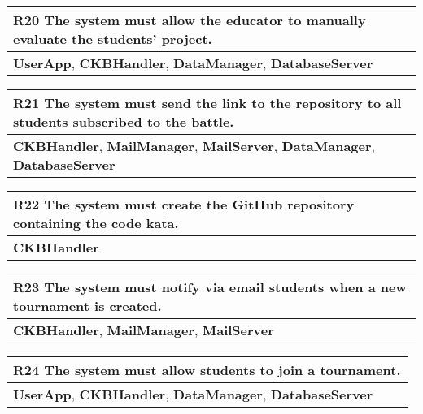 \begin{table}[H]
    \begin{tabularx}{\textwidth}{X}
        \toprule
        \textbf{R20} The system must allow the educator to manually evaluate the students' project. \\ \midrule
        \textbf{UserApp}, \textbf{CKBHandler}, \textbf{DataManager}, \textbf{DatabaseServer} \\
        \end{tabularx}
\end{table}

\begin{table}[H]
    \begin{tabularx}{\textwidth}{X}
        \toprule
        \textbf{R21} The system must send the link to the repository to all students subscribed to the battle.\\ \midrule
        \textbf{CKBHandler}, \textbf{MailManager}, \textbf{MailServer}, \textbf{DataManager}, \textbf{DatabaseServer} \\
    \end{tabularx}
\end{table}

\begin{table}[H]
    \begin{tabularx}{\textwidth}{X}
        \toprule
        \textbf{R22} The system must create the GitHub repository containing the code kata. \\ \midrule
        \textbf{CKBHandler}                   \\
    \end{tabularx}
\end{table}

\begin{table}[H]
    \begin{tabularx}{\textwidth}{X}
        \toprule
        \textbf{R23} The system must notify via email students when a new tournament is created. \\ \midrule
        \textbf{CKBHandler}, \textbf{MailManager}, \textbf{MailServer} \\
    \end{tabularx}
\end{table}

\begin{table}[H]
    \begin{tabularx}{\textwidth}{X}
        \toprule
        \textbf{R24} The system must allow students to join a tournament. \\ \midrule
        \textbf{UserApp}, \textbf{CKBHandler}, \textbf{DataManager}, \textbf{DatabaseServer} \\
        \end{tabularx}
\end{table}

